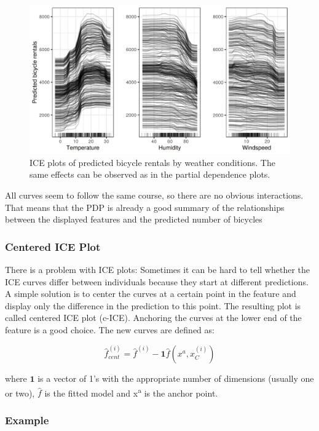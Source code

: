 \documentclass[12pt,]{krantz}
\begin{document}
\begin{figure}

{\centering \includegraphics[width=\textwidth]{images/ice-bike-1} 

}

\caption{ICE plots of predicted bicycle rentals by weather conditions. The same effects can be observed as in the partial dependence plots.}\label{fig:ice-bike}
\end{figure}

All curves seem to follow the same course, so there are no obvious
interactions. That means that the PDP is already a good summary of the
relationships between the displayed features and the predicted number of
bicycles

\subsubsection{Centered ICE Plot}\label{centered-ice-plot}

There is a problem with ICE plots: Sometimes it can be hard to tell
whether the ICE curves differ between individuals because they start at
different predictions. A simple solution is to center the curves at a
certain point in the feature and display only the difference in the
prediction to this point. The resulting plot is called centered ICE plot
(c-ICE). Anchoring the curves at the lower end of the feature is a good
choice. The new curves are defined as:

\[\hat{f}_{cent}^{(i)}=\hat{f}^{(i)}-\mathbf{1}\hat{f}(x^{a},x^{(i)}_{C})\]

where \(\mathbf{1}\) is a vector of 1's with the appropriate number of
dimensions (usually one or two), \(\hat{f}\) is the fitted model and
x\textsuperscript{a} is the anchor point.

\subsubsection{Example}\label{example-4}
\end{document}
